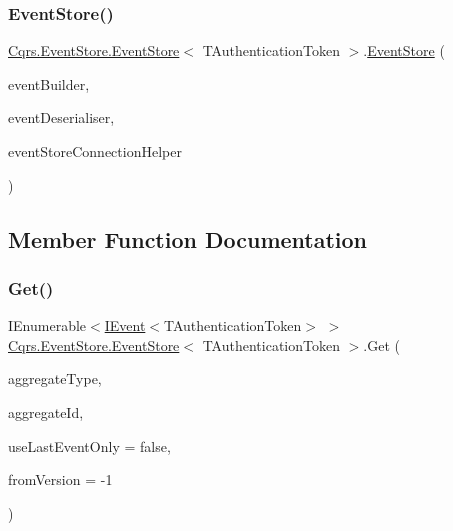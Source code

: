 \subsubsection{\texorpdfstring{Event\+Store()}{EventStore()}}
{\footnotesize\ttfamily \hyperlink{classCqrs_1_1EventStore_1_1EventStore}{Cqrs.\+Event\+Store.\+Event\+Store}$<$ T\+Authentication\+Token $>$.\hyperlink{classCqrs_1_1EventStore_1_1EventStore}{Event\+Store} (\begin{DoxyParamCaption}\item[{\hyperlink{interfaceCqrs_1_1EventStore_1_1IEventBuilder}{I\+Event\+Builder}$<$ T\+Authentication\+Token $>$}]{event\+Builder,  }\item[{\hyperlink{interfaceCqrs_1_1EventStore_1_1IEventDeserialiser}{I\+Event\+Deserialiser}$<$ T\+Authentication\+Token $>$}]{event\+Deserialiser,  }\item[{\hyperlink{interfaceCqrs_1_1EventStore_1_1IEventStoreConnectionHelper}{I\+Event\+Store\+Connection\+Helper}}]{event\+Store\+Connection\+Helper }\end{DoxyParamCaption})}



\subsection{Member Function Documentation}
\mbox{\label{classCqrs_1_1EventStore_1_1EventStore_a9d7b3a3ebcf110fe02d53e2ada19933d_a9d7b3a3ebcf110fe02d53e2ada19933d}} 
\subsubsection{\texorpdfstring{Get()}{Get()}\hspace{0.1cm}{\footnotesize\ttfamily [1/2]}}
{\footnotesize\ttfamily I\+Enumerable$<$\hyperlink{interfaceCqrs_1_1Events_1_1IEvent}{I\+Event}$<$T\+Authentication\+Token$>$ $>$ \hyperlink{classCqrs_1_1EventStore_1_1EventStore}{Cqrs.\+Event\+Store.\+Event\+Store}$<$ T\+Authentication\+Token $>$.Get (\begin{DoxyParamCaption}\item[{Type}]{aggregate\+Type,  }\item[{Guid}]{aggregate\+Id,  }\item[{bool}]{use\+Last\+Event\+Only = {\ttfamily false},  }\item[{int}]{from\+Version = {\ttfamily -\/1} }\end{DoxyParamCaption})}



